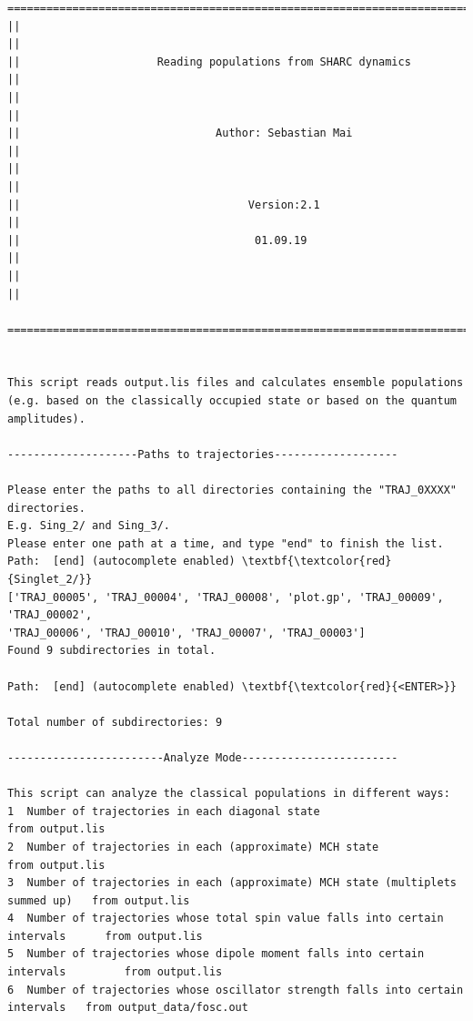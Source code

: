 \documentclass[a4paper,11pt,DIV=15,openany]{scrbook}
\begin{document}
\begin{oframed}
\footnotesize\begin{Verbatim}[commandchars=\\\{\}]
  ================================================================================
||                                                                                ||
||                     Reading populations from SHARC dynamics                    ||
||                                                                                ||
||                              Author: Sebastian Mai                             ||
||                                                                                ||
||                                   Version:2.1                                  ||
||                                    01.09.19                                    ||
||                                                                                ||
  ================================================================================


This script reads output.lis files and calculates ensemble populations 
(e.g. based on the classically occupied state or based on the quantum amplitudes).
  
--------------------Paths to trajectories-------------------

Please enter the paths to all directories containing the "TRAJ_0XXXX" directories.
E.g. Sing_2/ and Sing_3/. 
Please enter one path at a time, and type "end" to finish the list.
Path:  [end] (autocomplete enabled) \textbf{\textcolor{red}{Singlet_2/}}
['TRAJ_00005', 'TRAJ_00004', 'TRAJ_00008', 'plot.gp', 'TRAJ_00009', 'TRAJ_00002', 
'TRAJ_00006', 'TRAJ_00010', 'TRAJ_00007', 'TRAJ_00003']
Found 9 subdirectories in total.

Path:  [end] (autocomplete enabled) \textbf{\textcolor{red}{<ENTER>}}

Total number of subdirectories: 9

------------------------Analyze Mode------------------------

This script can analyze the classical populations in different ways:
1  Number of trajectories in each diagonal state                                   from output.lis
2  Number of trajectories in each (approximate) MCH state                          from output.lis
3  Number of trajectories in each (approximate) MCH state (multiplets summed up)   from output.lis
4  Number of trajectories whose total spin value falls into certain intervals      from output.lis
5  Number of trajectories whose dipole moment falls into certain intervals         from output.lis
6  Number of trajectories whose oscillator strength falls into certain intervals   from output_data/fosc.out


\end{Verbatim}
\end{oframed}
\end{document}
